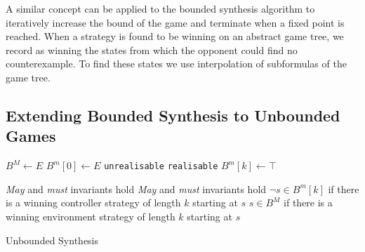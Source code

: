 \documentclass{llncs}
\begin{document}
A similar concept can be applied to the bounded synthesis algorithm to
iteratively increase the bound of the game and terminate when a fixed point is
reached. When a strategy is found to be winning on an abstract game tree, we
record as winning the states from which the opponent could find no
counterexample. To find these states we use interpolation of subformulas of the
game tree.


\subsection{Extending Bounded Synthesis to Unbounded Games}

\begin{algorithm}[h]
    \begin{algorithmic}[1]
            \State $B^M \gets E$
            \State $B^m[0] \gets E$
                    \Return \texttt{unrealisable} 
                \EndIIf
                    \Return \texttt{realisable} 
                \EndIIf
                \State $B^m[k] \gets \top$
                \State {}
            \EndFor
        \EndFunction
    \end{algorithmic}

    \begin{algorithmic}
        \Require \emph{May} and \emph{must} invariants hold
        \Ensure \emph{May} and \emph{must} invariants hold
        \Ensure $\lnot s \in B^m[k]$ if there is a winning controller strategy of length $k$ starting at $s$
        \Ensure $s \in B^M$ if there is a winning environment strategy of length $k$ starting at $s$
            \State \Return {}
        \EndFunction
    \end{algorithmic}
    \caption{Unbounded Synthesis}
    \label{alg:unbounded}
\end{algorithm}
\end{document}
